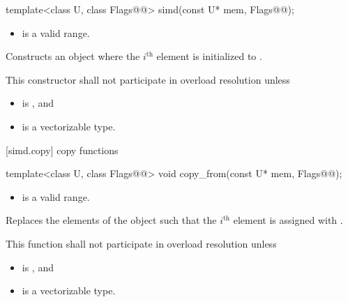 \begin{itemdecl}
template<class U, class Flags@@> simd(const U* mem, Flags@\wgAdd{ = \{\}}@);
\end{itemdecl}

\begin{itemdescr}
  \pnum\requires
  \begin{itemize}
    \item \tcode{[mem, mem + size())} is a valid range.
  \end{itemize}

  \pnum\effects
  Constructs an object where the $i^\text{th}$ element is initialized to  \foralli.

  \pnum\remarks
  This constructor shall not participate in overload resolution unless
  \begin{itemize}
    \item {} is , and
    \item {} is a vectorizable type.
  \end{itemize}
\end{itemdescr}

[simd.copy]{ copy functions}

\begin{itemdecl}
template<class U, class Flags@@> void copy_from(const U* mem, Flags@\wgAdd{ = \{\}}@);
\end{itemdecl}

\begin{itemdescr}
  \pnum\requires
  \begin{itemize}
    \item \tcode{[mem, mem + size())} is a valid range.
  \end{itemize}

  \pnum\effects
  Replaces the elements of the  object such that the $i^\text{th}$ element is assigned with  \foralli.

  \pnum\remarks
  This function shall not participate in overload resolution unless
  \begin{itemize}
    \item {} is , and
    \item {} is a vectorizable type.
  \end{itemize}
\end{itemdescr}

